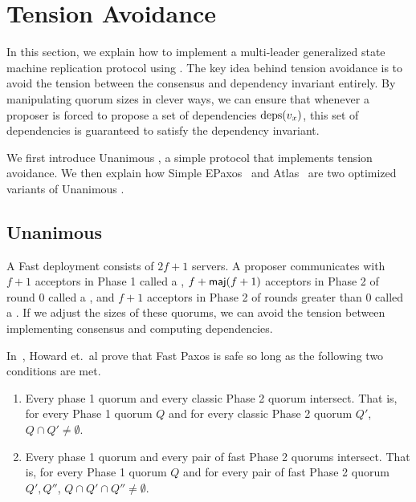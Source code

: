 \section{Tension Avoidance}
In this section, we explain how to implement a multi-leader generalized state
machine replication protocol using . The key idea
behind tension avoidance is to avoid the tension between the consensus and
dependency invariant entirely. By manipulating quorum sizes in clever ways, we
can ensure that whenever a proposer is forced to propose a set of dependencies
$\text{deps}(v_x)$, this set of dependencies is guaranteed to satisfy the dependency
invariant.

We first introduce Unanimous \BPaxos{}, a simple protocol that implements
tension avoidance. We then explain how Simple EPaxos~\cite{moraru2013there} and
Atlas~\cite{enes2020state} are two optimized variants of Unanimous \BPaxos{}.


\subsection{Unanimous \BPaxos{}}
A Fast \BPaxos{} deployment consists of $2f+1$ servers. A proposer communicates
with $f+1$ acceptors in Phase 1 called a , $f +
\textsf{maj}(f+1)$ acceptors in Phase 2 of round $0$ called a , and $f + 1$ acceptors in Phase 2 of rounds greater than $0$ called a
. If we adjust the sizes of these quorums, we
can avoid the tension between implementing consensus and computing
dependencies.

In~\cite{howard2021fast}, Howard et.\ al prove that Fast Paxos is safe so long
as the following two conditions are met.
\begin{enumerate}
  \item
    Every phase 1 quorum and every classic Phase 2 quorum intersect. That is,
    for every Phase 1 quorum $Q$ and for every classic Phase 2 quorum $Q'$, $Q
    \cap Q' \neq \emptyset$.

  \item
    Every phase 1 quorum and every pair of fast Phase 2 quorums intersect. That
    is, for every Phase 1 quorum $Q$ and for every pair of fast Phase 2 quorum
    $Q', Q''$, $Q \cap Q' \cap Q'' \neq \emptyset$.
\end{enumerate}

{}

